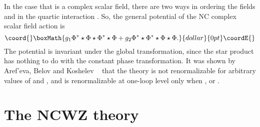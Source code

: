 \documentclass[a4paper,a4paper]{article}
\begin{document}
In the case that \myHighlight{$\Phi$}\coordHE{} is a complex scalar field, there are two ways in ordering the 
fields \myHighlight{$\Phi$}\coordHE{} and \myHighlight{$\Phi^\ast$}\coordHE{} in the quartic interaction \coordHE{}. So, the 
general potential of the NC complex scalar field action is 
$$\coord{}\boxMath{g_1\Phi^\ast\star\Phi\star\Phi^\ast\star\Phi+g_2\Phi^\ast\star\Phi^\ast\star\Phi\star\Phi.
}{dollar}{0pt}\coordE{}$$
The potential is invariant under the global transformation, 
since the star product has nothing to 
do with the constant phase transformation. It was shown by Aref'eva, Belov and Koshelev
~\cite{ABK2} that the theory is not 
renormalizable for arbitrary values of \coordHE{} and \coordHE{}, and is renormalizable at one-loop 
level only when \coordHE{}, or \coordHE{}.

\section{The NCWZ theory}
\end{document}
